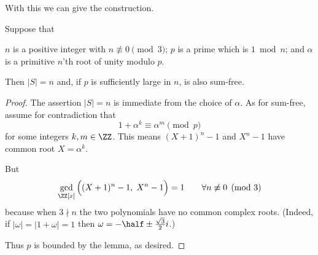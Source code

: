 \documentclass[11pt]{scrartcl}
\begin{document}
With this we can give the construction.
\begin{claim*}
  Suppose that
  \begin{itemize}
    \ii $n$ is a positive integer with $n \not\equiv 0 \pmod 3$;
    \ii $p$ is a prime which is $1 \bmod n$; and
    \ii $\alpha$ is a primitive $n$'th root of unity modulo $p$.
  \end{itemize}
  Then $|S| = n$ and, if $p$ is sufficiently large in $n$,
  is also sum-free.
\end{claim*}
\begin{proof}
  The assertion $|S|=n$ is immediate from the choice of $\alpha$.
  As for sum-free, assume for contradiction that
  \[ 1 + \alpha^k \equiv \alpha^m \pmod p \]
  for some integers $k,m \in \ZZ$.
  This means $(X+1)^n-1$ and $X^n-1$ have common root $X=\alpha^k$.

  But
  \[ \gcd_{\ZZ[x]} \Big( (X+1)^n-1, \; X^n-1 \Big)
    = 1 \qquad \forall n \not\equiv 0 \pmod 3 \]
  because when $3 \nmid n$ the two polynomials
  have no common complex roots.
  (Indeed, if $|\omega| = |1+\omega| = 1$
  then $\omega = -\half \pm \frac{\sqrt3}{2}i$.)

  Thus $p$ is bounded by the lemma, as desired.
\end{proof}
\pagebreak
\end{document}
